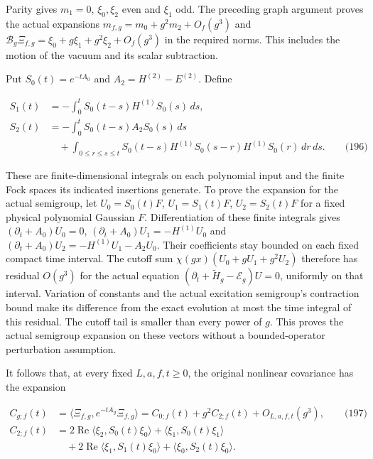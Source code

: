 Parity gives \(m_1=0\), \(\xi_0,\xi_2\) even and \(\xi_1\) odd. The
preceding graph argument proves the actual expansions
\(m_{f,g}=m_0+g^2m_2+O_f(g^3)\) and
\(\mathcal B_g\Xi_{f,g}=\xi_0+g\xi_1+g^2\xi_2+O_f(g^3)\) in the required
norms. This includes the motion of the vacuum and its scalar
subtraction.

Put \(S_0(t)=e^{-tA_0}\) and \(A_2=H^{(2)}-E^{(2)}\). Define

\[
\begin{aligned}
 S_1(t)&=-\int_0^t S_0(t-s)H^{(1)}S_0(s)\,ds,\\
 S_2(t)&=-\int_0^t S_0(t-s)A_2S_0(s)\,ds\\
 &\quad+\int_{0\le r\le s\le t}
 S_0(t-s)H^{(1)}S_0(s-r)H^{(1)}S_0(r)\,dr\,ds .
       \qquad\text{(196)}
\end{aligned}
\]

These are finite-dimensional integrals on each polynomial input and the
finite Fock spaces its indicated insertions generate. To prove the
expansion for the actual semigroup, let \(U_0=S_0(t)F\),
\(U_1=S_1(t)F\), \(U_2=S_2(t)F\) for a fixed physical polynomial
Gaussian \(F\). Differentiation of these finite integrals gives
\((\partial_t+A_0)U_0=0\), \((\partial_t+A_0)U_1=-H^{(1)}U_0\) and
\((\partial_t+A_0)U_2=-H^{(1)}U_1-A_2U_0\). Their coefficients stay
bounded on each fixed compact time interval. The cutoff sum
\(\chi(gx)(U_0+gU_1+g^2U_2)\) therefore has residual \(O(g^3)\) for the
actual equation \((\partial_t+\widetilde H_g-\mathcal E_g)U=0\),
uniformly on that interval. Variation of constants and the actual
excitation semigroup's contraction bound make its difference from the
exact evolution at most the time integral of this residual. The cutoff
tail is smaller than every power of \(g\). This proves the actual
semigroup expansion on these vectors without a bounded-operator
perturbation assumption.

It follows that, at every fixed \(L,a,f,t\ge0\), the original nonlinear
covariance has the expansion

\[
\begin{aligned}
 C_{g;f}(t)&=\langle\Xi_{f,g},e^{-tA_g}\Xi_{f,g}\rangle
       =C_{0;f}(t)+g^2 C_{2;f}(t)+O_{L,a,f,t}(g^3),
       \qquad\text{(197)}\\
 C_{2;f}(t)&=2\operatorname{Re}\langle\xi_2,S_0(t)\xi_0\rangle
       +\langle\xi_1,S_0(t)\xi_1\rangle\\
 &\quad+2\operatorname{Re}\langle\xi_1,S_1(t)\xi_0\rangle
       +\langle\xi_0,S_2(t)\xi_0\rangle .
\end{aligned}
\]


